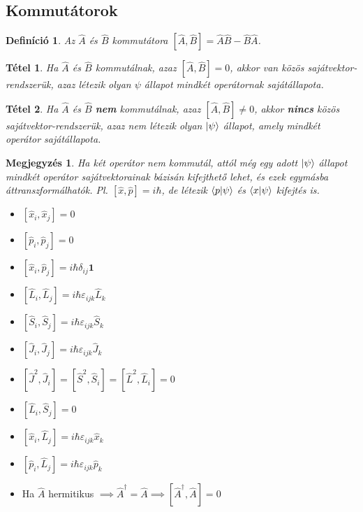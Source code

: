 \documentclass[12pt]{article}
\theoremstyle{plain}
\newcommand{\commut}[2]{\left [ #1 , #2 \right]}
\newtheorem*{theorem*}{Tétel}
\newtheorem*{def*}{Definíció}
\newtheorem*{megj}{Megjegyzés}
\begin{document}
\subsection{Kommutátorok}
\begin{def*}
    Az $\hat A$ és $\hat B$ kommutátora $\commut{\hat A}{\hat B} = \hat A \hat B - \hat B \hat A$. 
\end{def*}
\begin{theorem*}
    Ha $\hat A$ és $\hat B$ kommutálnak, azaz $\commut{\hat A}{\hat B} = 0$, akkor van közös sajátvektor-rendszerük, azaz létezik olyan
    $\psi$ állapot mindkét operátornak sajátállapota.
\end{theorem*}
\begin{theorem*}
    Ha $\hat A$ és $\hat B$ \textbf{nem} kommutálnak, azaz $\commut{\hat A}{\hat B} \neq 0$, akkor \textbf{nincs} közös sajátvektor-rendszerük, azaz nem 
    létezik olyan $\ket\psi$ állapot, amely mindkét operátor sajátállapota.
\end{theorem*}
\begin{megj}
    Ha két operátor nem kommutál, attól még egy adott $\ket\psi$ állapot mindkét operátor sajátvektorainak bázisán kifejthető lehet,
    és ezek egymásba áttranszformálhatók. Pl. $\commut{\hat x}{\hat p} = i\hbar$, de létezik $\braket{p|\psi}$ és $\braket{x|\psi}$
    kifejtés is.
\end{megj}
\begin{itemize}
    \item $\commut{\hat x_i}{\hat x_j} = 0$
    \item $\commut{\hat p_i}{\hat p_j} = 0$
    \item $\commut{\hat x_i}{\hat p_j} = i\hbar \delta_{ij}\mathbf 1$
    \item $\commut{\hat L_i}{\hat L_j} = i \hbar \varepsilon_{ijk}\hat L_k$
    \item $\commut{\hat S_i}{\hat S_j} = i \hbar \varepsilon_{ijk}\hat S_k$
    \item $\commut{\hat J_i}{\hat J_j} = i \hbar \varepsilon_{ijk}\hat J_k$
    \item $\commut{\hat J^2}{\hat J_i} = \commut{\hat S^2}{\hat S_i} = \commut{\hat L^2}{\hat L_i} = 0$
    \item $\commut{\hat L_i}{\hat S_j} = 0$
    \item $\commut{\hat x_i}{\hat L_j} = i \hbar \varepsilon_{ijk}\hat x_k$
    \item $\commut{\hat p_i}{\hat L_j} = i \hbar \varepsilon_{ijk}\hat p_k$    
    \item Ha $\hat A$ hermitikus $\implies \hat A^\dag = \hat A \implies \commut{\hat A^\dag}{\hat A} = 0$  
    
    
\end{itemize}
\end{document}
